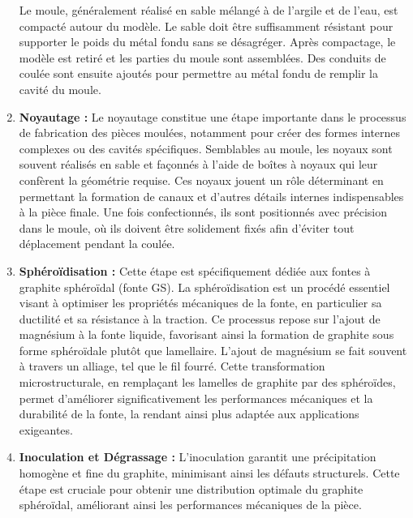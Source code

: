 \documentclass[12pt]{article}
\begin{document}
\begin{enumerate}
    Le moule, généralement réalisé en sable mélangé à de l'argile et de 
    l'eau, est compacté autour du modèle. Le sable doit être suffisamment 
    résistant pour supporter le poids du métal fondu sans se désagréger. 
    Après compactage, le modèle est retiré et les parties du moule sont 
    assemblées. Des conduits de coulée sont ensuite ajoutés pour permettre 
    au métal fondu de remplir la cavité du moule.



    \item \textbf{Noyautage :} 
    Le noyautage constitue une étape importante dans le processus de 
    fabrication des pièces moulées, notamment pour créer des formes 
    internes complexes ou des cavités spécifiques. Semblables au moule, 
    les noyaux sont souvent réalisés en sable et façonnés à l'aide de 
    boîtes à noyaux qui leur confèrent la géométrie requise. Ces noyaux 
    jouent un rôle déterminant en permettant la formation de canaux et 
    d'autres détails internes indispensables à la pièce finale. 
    Une fois confectionnés, ils sont positionnés avec précision dans 
    le moule, où ils doivent être solidement fixés afin d'éviter 
    tout déplacement pendant la coulée.


    \item \textbf{Sphéroïdisation :} 
    Cette étape est spécifiquement dédiée aux fontes à graphite sphéroïdal 
    (fonte GS). La sphéroïdisation est un procédé essentiel visant à 
    optimiser les propriétés mécaniques de la fonte, en particulier sa 
    ductilité et sa résistance à la traction. Ce processus repose sur 
    l’ajout de magnésium à la fonte liquide, favorisant ainsi la formation 
    de graphite sous forme sphéroïdale plutôt que lamellaire. L'ajout de 
    magnésium se fait souvent à travers un alliage, tel que le fil fourré. 
    Cette transformation microstructurale, en remplaçant les lamelles de 
    graphite par des sphéroïdes, permet d'améliorer significativement les 
    performances mécaniques et la durabilité de la fonte, la rendant ainsi 
    plus adaptée aux applications exigeantes.



    \item \textbf{Inoculation et Dégrassage :} L'inoculation garantit une 
    précipitation homogène et fine du graphite, minimisant ainsi les 
    défauts structurels. Cette étape est cruciale pour obtenir une 
    distribution optimale du graphite sphéroïdal, améliorant ainsi les 
    performances mécaniques de la pièce.


\end{enumerate}
\end{document}
